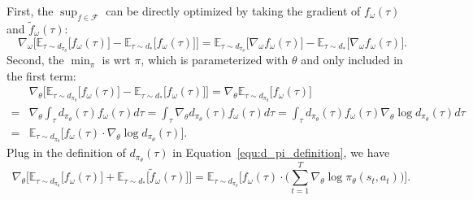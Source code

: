 First, the $\sup_{f\in\mathcal{F}}$ can be directly optimized by taking the gradient of $f_{\omega}(\tau)$ and $\tilde{f}_{\omega}(\tau)$: 
\begin{equation}~\label{equ:gradient_critic}
\nabla_{\omega} \Big[ \mathbb{E}_{\tau\sim d_{\pi_{\theta}}} \big[ f_{\omega}(\tau) \big] - \mathbb{E}_{\tau\sim d_*} \big[ f_{\omega}(\tau) \big] \Big]
= \mathbb{E}_{\tau\sim d_{\pi_{\theta}}} \big[ \nabla_{\omega} f_{\omega}(\tau) \big] - \mathbb{E}_{\tau\sim d_*} \big[ \nabla_{\omega} f_{\omega}(\tau) \big].
\end{equation}
Second, the $\min_{\pi}$ is wrt $\pi$, which is parameterized with $\theta$ and only included in the first term:
\begin{align*}
& \nabla_{\theta} \Big[ \mathbb{E}_{\tau\sim d_{\pi_{\theta}}} \big[ f_{\omega}(\tau) \big] - \mathbb{E}_{\tau\sim d_*} \big[ f_{\omega}(\tau) \big] \Big] 
= \nabla_{\theta} \mathbb{E}_{\tau\sim d_{\pi_{\theta}}} \big[ f_{\omega}(\tau) \big] \\
= & \nabla_{\theta} \int_{\tau} d_{\pi_{\theta}}(\tau) f_{\omega}(\tau) d\tau 
= \int_{\tau} \nabla_{\theta} d_{\pi_{\theta}}(\tau) f_{\omega}(\tau) d\tau 
= \int_{\tau}  d_{\pi_{\theta}}(\tau) f_{\omega}(\tau) \nabla_{\theta}\log d_{\pi_{\theta}}(\tau)  d\tau \\
= & \mathbb{E}_{\tau\sim d_{\pi_\theta}} \big[ f_{\omega}(\tau) \cdot \nabla_{\theta}\log d_{\pi_{\theta}}(\tau) \big].
\end{align*}
Plug in the definition of $d_{\pi_{\theta}}(\tau)$ in Equation~\ref{equ:d_pi_definition}, we have
\begin{equation*}
\nabla_{\theta} \Big[ \mathbb{E}_{\tau\sim d_{\pi_{\theta}}} \big[ f_{\omega}(\tau) \big] + \mathbb{E}_{\tau\sim d_*} \big[ \tilde{f}_{\omega}(\tau) \big] \Big] 
= \mathbb{E}_{\tau\sim d_{\pi_\theta}} \Big[ f_{\omega}(\tau) \cdot \big( \sum_{t=1}^{T}\nabla_{\theta}\log \pi_{\theta}(s_t, a_t) \big) \Big].
\end{equation*}

